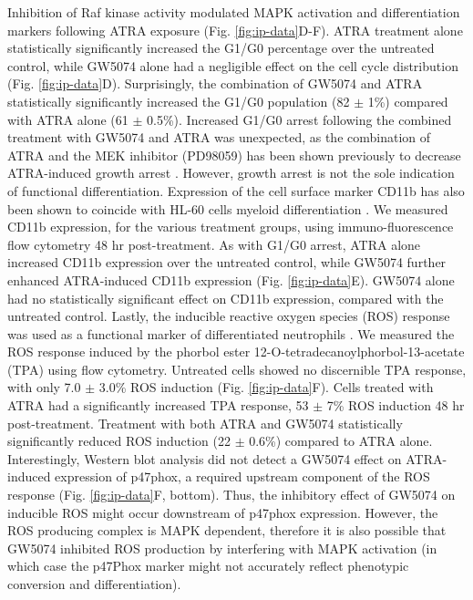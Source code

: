 \documentclass[12pt]{article}
\begin{document}
Inhibition of Raf kinase activity modulated MAPK activation and differentiation markers following ATRA exposure (Fig. \ref{fig:ip-data}D-F).
ATRA treatment alone statistically significantly increased the G1/G0 percentage over the untreated control,
while GW5074 alone had a negligible effect on the cell cycle distribution (Fig. \ref{fig:ip-data}D).
Surprisingly, the combination of GW5074 and ATRA statistically significantly increased the G1/G0 population (82 $\pm$ 1\%)
compared with ATRA alone (61 $\pm$ 0.5\%).
Increased G1/G0 arrest following the combined treatment with GW5074 and ATRA was unexpected,
as the combination of ATRA and the MEK inhibitor (PD98059) has been shown previously to decrease ATRA-induced growth arrest \cite{Yen1998}.
However, growth arrest is not the sole indication of functional differentiation.
Expression of the cell surface marker CD11b has also been shown to coincide with HL-60 cells myeloid differentiation \cite{Hickstein1989}.
We measured CD11b expression, for the various treatment groups, using immuno-fluorescence flow cytometry 48 hr post-treatment.
As with G1/G0 arrest, ATRA alone increased CD11b expression over the untreated control,
while GW5074 further enhanced ATRA-induced CD11b expression (Fig. \ref{fig:ip-data}E).
GW5074 alone had no statistically significant effect on CD11b expression, compared with the untreated control.
Lastly, the inducible reactive oxygen species (ROS) response was used as a functional marker of differentiated neutrophils \cite{Congleton2011}.
We measured the ROS response induced by the phorbol ester 12-O-tetradecanoylphorbol-13-acetate (TPA) using flow cytometry.
Untreated cells showed no discernible TPA response,
with only 7.0 $\pm$ 3.0\% ROS induction (Fig. \ref{fig:ip-data}F).
Cells treated with ATRA had a significantly increased TPA response, 53 $\pm$ 7\% ROS induction 48 hr post-treatment.
Treatment with both ATRA and GW5074 statistically significantly reduced ROS induction (22 $\pm$ 0.6\%) compared to ATRA alone.
Interestingly, Western blot analysis did not detect a GW5074 effect on ATRA-induced expression of p47phox,
a required upstream component of the ROS response  (Fig. \ref{fig:ip-data}F, bottom).
Thus, the inhibitory effect of GW5074 on inducible ROS might occur downstream of p47phox expression.
However, the ROS producing complex is MAPK dependent,
therefore it is also possible that GW5074 inhibited ROS production by interfering
with MAPK activation (in which case the p47Phox marker might not accurately reflect phenotypic conversion and differentiation).
\end{document}
